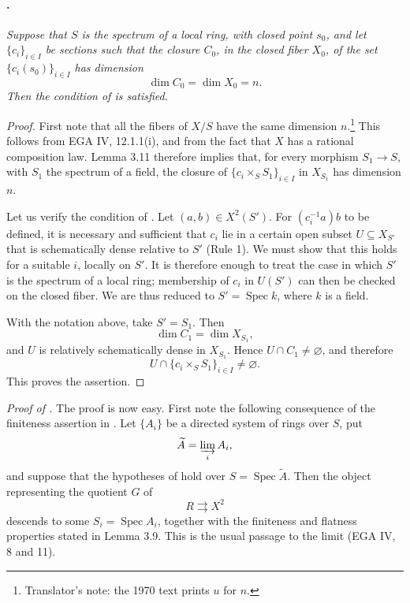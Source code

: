 \paragraph{.}
\textit{Suppose that \(S\) is the spectrum of a local ring, with
closed point \(s_0\), and let \(\{c_i\}_{i\in I}\) be sections
such that the closure \(C_0\), in the closed fiber \(X_0\), of
the set \(\{c_i(s_0)\}_{i\in I}\) has dimension
\[
  \dim C_0=\dim X_0=n.
\]
Then the condition of  is satisfied.}

\begin{proof}
First note that all the fibers of \(X/S\) have the same
dimension \(n\).\footnote{Translator's note: the 1970 text prints \(u\) for \(n\).} This follows from EGA IV, 12.1.1(i), and from the fact
that \(X\) has a rational composition law. Lemma 3.11 therefore
implies that, for every morphism \(S_1\to S\), with \(S_1\) the
spectrum of a field, the closure of
\(\{c_i\times_S S_1\}_{i\in I}\) in \(X_{S_1}\) has dimension
\(n\).

Let us verify the condition of . Let
\((a,b)\in X^2(S')\). For \((c_i^{-1}a)b\) to be defined, it is
necessary and sufficient that \(c_i\) lie in a certain open
subset \(U\subseteq X_{S'}\) that is schematically dense relative
to \(S'\) (Rule 1). We must show that this holds for a suitable
\(i\), locally on \(S'\). It is therefore enough to treat the
case in which \(S'\) is the spectrum of a local ring; membership
of \(c_i\) in \(U(S')\) can then be checked on the closed fiber.
We are thus reduced to \(S'=\operatorname{Spec}k\), where \(k\)
is a field.

With the notation above, take \(S'=S_1\). Then
\[
  \dim C_1=\dim X_{S_1},
\]
and \(U\) is relatively schematically dense in \(X_{S_1}\).
Hence \(U\cap C_1\neq\varnothing\), and therefore
\[
  U\cap\{c_i\times_S S_1\}_{i\in I}\neq\varnothing.
\]
This proves the assertion.
\end{proof}

\noindent\textit{Proof of .}
The proof is now easy. First note the following consequence of
the finiteness assertion in . Let \(\{A_i\}\) be a
directed system of rings over \(S\), put
\[
  \widetilde A=\varinjlim_i A_i,
\]
and suppose that the hypotheses of  hold over
\(S=\operatorname{Spec}\widetilde A\). Then the object
representing the quotient \(G\) of
\[
  R\rightrightarrows X^2
\]
descends to some \(S_i=\operatorname{Spec}A_i\), together with
the finiteness and flatness properties stated in Lemma 3.9. This
is the usual passage to the limit (EGA IV, 8 and 11).

